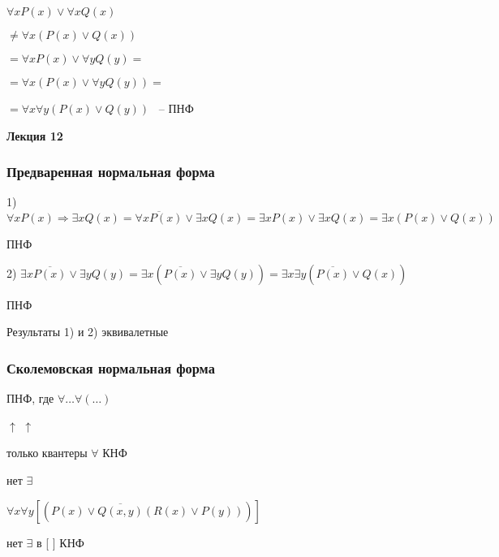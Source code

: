 \documentclass[russian]{lecture-notes}
\begin{document}
    \begin{example}
        $\forall x P(x) \lor \forall x Q(x)$

        $\neq \forall x (P(x) \lor Q(x))$

        $ = \forall x P(x) \lor \forall y Q(y) = $

        $= \forall x (P(x) \lor \forall y Q(y)) = $

        $= \forall x \forall y (P(x) \lor Q(y))$ ~-- ПНФ
    \end{example}
     \textbf{Лекция 12}

    \subsubsection{Предваренная нормальная форма}

    \begin{example}

        1) $\forall x P(x) \Rightarrow \exists x Q(x) = \overline{\forall x P(x)} \lor \exists x Q(x)
        = \exists x P(x) \lor \exists x Q(x) = \exists x
        ( P(x) \lor Q(x))$

    \quad ПНФ

        2) $\exists x \overline{P(x)} \lor \exists y Q(y) = \exists x (\overline{P(x)} \lor \exists y Q(y)) =
        \exists x \exists y (\overline{P(x)} \lor Q(x))$

    \qquad \qquad \qquad \qquad \qquad \qquad \qquad \qquad \qquad \qquad \qquad ПНФ

        Результаты 1) и 2) эквивалетные

    \end{example}

    \subsubsection{Сколемовская нормальная форма}

    \begin{definition}
        ПНФ, где $\forall \dots \forall (\dots)$

        \qquad \qquad \qquad \qquad \qquad \quad $\uparrow$ \qquad \quad $\uparrow$

        \qquad \quad  только квантеры $\forall$ \qquad КНФ

        \qquad \qquad \qquad нет $\exists$


        \end{definition}

    \begin{example}

        $\forall x \forall y [ (P(x) \lor \overline{Q(x,y)}(R(x) \lor P(y)))]$

        нет $\exists$ в [ ] КНФ

        \end{example}
\end{document}
